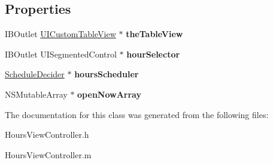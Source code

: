 \subsection*{Properties}
\begin{DoxyCompactItemize}
\item 
\hypertarget{interface_hours_view_controller_a226adb120882390c1213da12ecb4acfb}{
IBOutlet \hyperlink{interface_u_i_custom_table_view}{UICustomTableView} $\ast$ {\bfseries theTableView}}
\label{interface_hours_view_controller_a226adb120882390c1213da12ecb4acfb}

\item 
\hypertarget{interface_hours_view_controller_ae29199d19156172a9e1808c852b0c135}{
IBOutlet UISegmentedControl $\ast$ {\bfseries hourSelector}}
\label{interface_hours_view_controller_ae29199d19156172a9e1808c852b0c135}

\item 
\hypertarget{interface_hours_view_controller_a80ceb19db01a12e53f001a97fd2892b6}{
\hyperlink{interface_schedule_decider}{ScheduleDecider} $\ast$ {\bfseries hoursScheduler}}
\label{interface_hours_view_controller_a80ceb19db01a12e53f001a97fd2892b6}

\item 
\hypertarget{interface_hours_view_controller_a557f83108135f53f0d6f88e8a54b4894}{
NSMutableArray $\ast$ {\bfseries openNowArray}}
\label{interface_hours_view_controller_a557f83108135f53f0d6f88e8a54b4894}

\end{DoxyCompactItemize}


The documentation for this class was generated from the following files:\begin{DoxyCompactItemize}
\item 
HoursViewController.h\item 
HoursViewController.m\end{DoxyCompactItemize}
